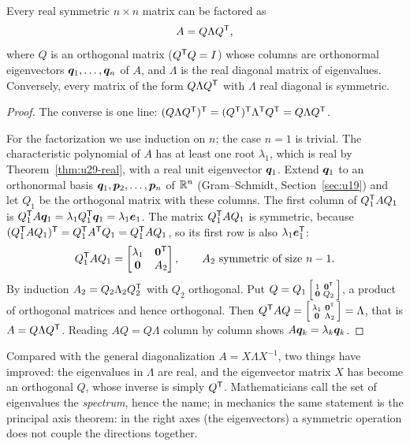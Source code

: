 \begin{theorem}\label{thm:u29-spectral}
Every real symmetric $n\times n$ matrix can be factored as
\[
  A=Q\Lambda Q^{\mathsf{T}} ,
\]
where $Q$ is an orthogonal matrix ($Q^{\mathsf{T}} Q=I$) whose columns are orthonormal eigenvectors
$\boldsymbol{q}_1,\dots,\boldsymbol{q}_n$ of $A$, and $\Lambda$ is the real diagonal matrix of eigenvalues.
Conversely, every matrix of the form $Q\Lambda Q^{\mathsf{T}}$ with $\Lambda$ real diagonal is symmetric.
\end{theorem}
\begin{proof}
The converse is one line: $(Q\Lambda Q^{\mathsf{T}})^{\mathsf{T}}=(Q^{\mathsf{T}})^{\mathsf{T}}\Lambda^{\mathsf{T}} Q^{\mathsf{T}}=Q\Lambda Q^{\mathsf{T}}$.

For the factorization we use induction on $n$; the case $n=1$ is trivial. The characteristic
polynomial of $A$ has at least one root $\lambda_1$, which is real by
Theorem~\ref{thm:u29-real}, with a real unit eigenvector $\boldsymbol{q}_1$. Extend $\boldsymbol{q}_1$ to an
orthonormal basis $\boldsymbol{q}_1,\boldsymbol{p}_2,\dots,\boldsymbol{p}_n$ of $\mathbb{R}^n$ (Gram--Schmidt,
Section~\ref{sec:u19}) and let $Q_1$ be the orthogonal matrix with these columns. The first
column of $Q_1^{\mathsf{T}} AQ_1$ is $Q_1^{\mathsf{T}} A\boldsymbol{q}_1=\lambda_1Q_1^{\mathsf{T}}\boldsymbol{q}_1=\lambda_1\boldsymbol{e}_1$. The matrix
$Q_1^{\mathsf{T}} AQ_1$ is symmetric, because $(Q_1^{\mathsf{T}} AQ_1)^{\mathsf{T}}=Q_1^{\mathsf{T}} A^{\mathsf{T}} Q_1=Q_1^{\mathsf{T}} AQ_1$, so its first row is
also $\lambda_1\boldsymbol{e}_1^{\mathsf{T}}$:
\[
  Q_1^{\mathsf{T}} AQ_1=\begin{bmatrix}\lambda_1&\boldsymbol{0}^{\mathsf{T}}\\ \boldsymbol{0}&A_2\end{bmatrix},
  \qquad A_2 \text{ symmetric of size } n-1 .
\]
By induction $A_2=Q_2\Lambda_2Q_2^{\mathsf{T}}$ with $Q_2$ orthogonal. Put
$Q=Q_1\left[\begin{smallmatrix}1&\boldsymbol{0}^{\mathsf{T}}\\ \boldsymbol{0}&Q_2\end{smallmatrix}\right]$, a product of
orthogonal matrices and hence orthogonal. Then
$Q^{\mathsf{T}} AQ=\left[\begin{smallmatrix}\lambda_1&\boldsymbol{0}^{\mathsf{T}}\\ \boldsymbol{0}&\Lambda_2\end{smallmatrix}\right]=\Lambda$,
that is $A=Q\Lambda Q^{\mathsf{T}}$. Reading $AQ=Q\Lambda$ column by column shows $A\boldsymbol{q}_k=\lambda_k\boldsymbol{q}_k$.
\end{proof}

Compared with the general diagonalization $A=X\Lambda X^{-1}$, two things have improved:
the eigenvalues in $\Lambda$ are real, and the eigenvector matrix $X$ has become an orthogonal
$Q$, whose inverse is simply $Q^{\mathsf{T}}$. Mathematicians call the set of eigenvalues the
\emph{spectrum}, hence the name; in mechanics the same statement is the principal axis
theorem: in the right axes (the eigenvectors) a symmetric operation does not couple the
directions together.


